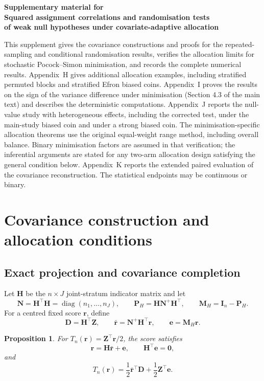 \documentclass[12pt,a4paper]{article}
\newtheorem{proposition}{Proposition}
\theoremstyle{definition}
\theoremstyle{remark}\newtheorem{remark}{Remark}
\numberwithin{equation}{section}
\newcommand{\diag}{\operatorname{diag}}
\begin{document}
\begin{center}
{\Large\bfseries Supplementary material for\\
Squared assignment correlations and randomisation tests\\ of weak null hypotheses under covariate-adaptive allocation}
\end{center}
\renewcommand{\thesection}{\Alph{section}}
This supplement gives the covariance constructions and proofs for the repeated-sampling and conditional randomisation results, verifies the allocation limits for stochastic Pocock--Simon minimisation, and records the complete numerical results. Appendix~H gives additional allocation examples, including stratified permuted blocks and stratified Efron biased coins. Appendix~I proves the results on the sign of the variance difference under minimisation (Section 4.3 of the main text) and describes the deterministic computations. Appendix~J reports the null-value study with heterogeneous effects, including the corrected test, under the main-study biased coin and under a strong biased coin. The minimisation-specific allocation theorems use the original equal-weight range method, including overall balance. Binary minimisation factors are assumed in that verification; the inferential arguments are stated for any two-arm allocation design satisfying the general condition below. Appendix~K reports the extended paired evaluation of the covariance reconstruction. The statistical endpoints may be continuous or binary.

\section{Covariance construction and allocation conditions}
\label{sec:supp-covariance}

\subsection{Exact projection and covariance completion}
Let $\bm H$ be the $n\times J$ joint-stratum indicator matrix and let
\[
\bm N=\bm H^\top\bm H=\diag(n_1,\ldots,n_J),
\qquad
\bm P_H=\bm H\bm N^+\bm H^\top,
\qquad
\bm M_H=\bm I_n-\bm P_H.
\]
For a centred fixed score $\bm r$, define
\[
\bm D=\bm H^\top\bm Z,
\qquad
\bar{\bm r}=\bm N^+\bm H^\top\bm r,
\qquad
\bm e=\bm M_H\bm r.
\]

\begin{proposition}\label{prop:supp-decomp}
For $T_n(\bm r)=\bm Z^\top\bm r/2$, the score satisfies
\[
\bm r=\bm H\bar{\bm r}+\bm e,
\qquad
\bm H^\top\bm e=\bm0,
\]
and
\begin{equation}\label{eq:supp-decomp}
T_n(\bm r)
=\frac12\bar{\bm r}^{\top}\bm D
+\frac12\bm Z^\top\bm e.
\end{equation}
\end{proposition}
\end{document}
